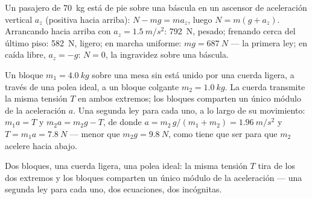 \begin{example}[El ascensor]\label{ex:g12:newtons-laws:elevator}
Un pasajero de \qty{70}{kg} está de pie sobre una báscula en un ascensor de
aceleración vertical $a_z$ (positiva hacia arriba): $N - mg = ma_z$, luego
$N = m(g + a_z)$. Arrancando hacia arriba con $a_z = \qty{1.5}{m/s^2}$: \qty{792}{N},
pesado; frenando cerca del último piso: \qty{582}{N}, ligero; en marcha uniforme:
$mg = \qty{687}{N}$ --- la primera ley; en caída libre, $a_z = -g$: $N = 0$, la
ingravidez sobre una báscula.
\end{example}

\begin{example}\label{ex:g12:newtons-laws:pulley}
Un bloque $m_1 = \qty{4.0}{kg}$ sobre una mesa sin  está unido por una
cuerda ligera, a través de una polea ideal, a un bloque colgante
$m_2 = \qty{1.0}{kg}$. La cuerda transmite la misma tensión $T$ en ambos extremos; los
bloques comparten un único módulo de la aceleración $a$. Una segunda ley para cada
uno, a lo largo de su movimiento: $m_1 a = T$ y $m_2 a = m_2 g - T$, de donde
$a = m_2\,g/(m_1 + m_2) = \qty{1.96}{m/s^2}$ y $T = m_1 a = \qty{7.8}{N}$ --- menor
que $m_2 g = \qty{9.8}{N}$, como tiene que ser para que $m_2$ acelere hacia abajo.
\end{example}

\begin{omfigure}

{\small Dos bloques, una cuerda ligera, una polea ideal: la misma tensión $T$ tira de
los dos extremos y los bloques comparten un único módulo de la aceleración --- una
segunda ley para cada uno, dos ecuaciones, dos incógnitas.}
\end{omfigure}

